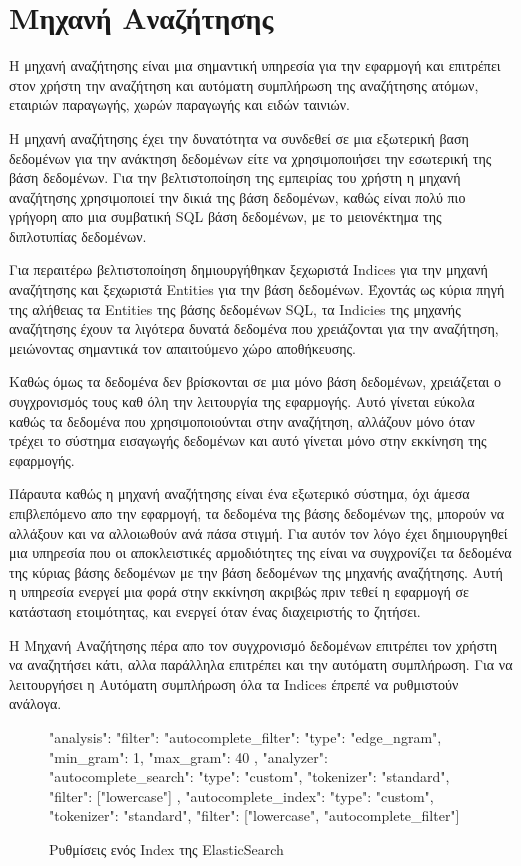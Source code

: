 \section{Μηχανή Αναζήτησης}
Η μηχανή αναζήτησης είναι μια σημαντική υπηρεσία για την εφαρμογή και επιτρέπει στον χρήστη την αναζήτηση και αυτόματη συμπλήρωση της αναζήτησης ατόμων, εταιριών παραγωγής, χωρών παραγωγής και ειδών ταινιών. 

Η μηχανή αναζήτησης έχει την δυνατότητα να συνδεθεί σε μια εξωτερική βαση δεδομένων για την ανάκτηση δεδομένων είτε να χρησιμοποιήσει την εσωτερική της βάση δεδομένων. Για την βελτιστοποίηση της εμπειρίας του χρήστη η μηχανή αναζήτησης χρησιμοποιεί την δικιά της βάση δεδομένων, καθώς είναι πολύ πιο γρήγορη απο μια συμβατική SQL βάση δεδομένων, με το μειονέκτημα της διπλοτυπίας δεδομένων. 

Για περαιτέρω βελτιστοποίηση δημιουργήθηκαν ξεχωριστά Indices για την μηχανή αναζήτησης και ξεχωριστά Entities για την βάση δεδομένων. Έχοντάς ως κύρια πηγή της αλήθειας τα Entities της βάσης δεδομένων SQL, τα Indicies της μηχανής αναζήτησης έχουν τα λιγότερα δυνατά δεδομένα που χρειάζονται για την αναζήτηση, μειώνοντας σημαντικά τον απαιτούμενο χώρο αποθήκευσης.

Καθώς όμως τα δεδομένα δεν βρίσκονται σε μια μόνο βάση δεδομένων, χρειάζεται ο συγχρονισμός τους καθ όλη την λειτουργία της εφαρμογής. Αυτό γίνεται εύκολα καθώς τα δεδομένα που χρησιμοποιούνται στην αναζήτηση, αλλάζουν μόνο όταν τρέχει το σύστημα εισαγωγής δεδομένων και αυτό γίνεται μόνο στην εκκίνηση της εφαρμογής.

Πάραυτα καθώς η μηχανή αναζήτησης είναι ένα εξωτερικό σύστημα, όχι άμεσα επιβλεπόμενο απο την εφαρμογή, τα δεδομένα της βάσης δεδομένων της, μπορούν να αλλάξουν και να αλλοιωθούν ανά πάσα στιγμή. Για αυτόν τον λόγο έχει δημιουργηθεί μια υπηρεσία που οι αποκλειστικές αρμοδιότητες της είναι να συγχρονίζει τα δεδομένα της κύριας βάσης δεδομένων με την βάση δεδομένων της μηχανής αναζήτησης. Αυτή η υπηρεσία ενεργεί μια φορά στην εκκίνηση ακριβώς πριν τεθεί η εφαρμογή σε κατάσταση ετοιμότητας, και ενεργεί όταν ένας διαχειριστής το ζητήσει. 

Η Μηχανή Αναζήτησης πέρα απο τον συγχρονισμό δεδομένων επιτρέπει τον χρήστη να αναζητήσει κάτι, αλλα παράλληλα επιτρέπει και την αυτόματη συμπλήρωση. Για να λειτουργήσει η Αυτόματη συμπλήρωση όλα τα Indices έπρεπέ να ρυθμιστούν ανάλογα.

\begin{figure}[H]
    \begin{jsoncode}
{"analysis": {
  "filter": {
    "autocomplete_filter": {
      "type": "edge_ngram",
      "min_gram": 1,
      "max_gram": 40
    }
  },
  "analyzer": {
    "autocomplete_search": {
      "type": "custom",
      "tokenizer": "standard",
      "filter": ["lowercase"]
    },
    "autocomplete_index": {
      "type": "custom",
      "tokenizer": "standard",
      "filter": ["lowercase", "autocomplete_filter"]
    }
  }
}}
    \end{jsoncode}
    \caption{Ρυθμίσεις ενός Index της ElasticSearch}
   \label{config:es}
\end{figure}


